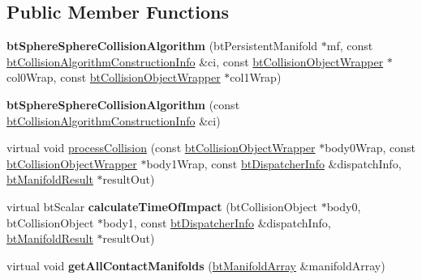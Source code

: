 \subsection*{Public Member Functions}
\begin{DoxyCompactItemize}
\item 
\hypertarget{classbt_sphere_sphere_collision_algorithm_a861896f2389f4b8b4a45fda9dc5f5a88}{{\bfseries bt\+Sphere\+Sphere\+Collision\+Algorithm} (bt\+Persistent\+Manifold $\ast$mf, const \hyperlink{structbt_collision_algorithm_construction_info}{bt\+Collision\+Algorithm\+Construction\+Info} \&ci, const \hyperlink{structbt_collision_object_wrapper}{bt\+Collision\+Object\+Wrapper} $\ast$col0\+Wrap, const \hyperlink{structbt_collision_object_wrapper}{bt\+Collision\+Object\+Wrapper} $\ast$col1\+Wrap)}\label{classbt_sphere_sphere_collision_algorithm_a861896f2389f4b8b4a45fda9dc5f5a88}

\item 
\hypertarget{classbt_sphere_sphere_collision_algorithm_a0e088c92f8e8a1e5a82b118dec7f930c}{{\bfseries bt\+Sphere\+Sphere\+Collision\+Algorithm} (const \hyperlink{structbt_collision_algorithm_construction_info}{bt\+Collision\+Algorithm\+Construction\+Info} \&ci)}\label{classbt_sphere_sphere_collision_algorithm_a0e088c92f8e8a1e5a82b118dec7f930c}

\item 
virtual void \hyperlink{classbt_sphere_sphere_collision_algorithm_a7e5adac437f8c0cdb738360d5946a65d}{process\+Collision} (const \hyperlink{structbt_collision_object_wrapper}{bt\+Collision\+Object\+Wrapper} $\ast$body0\+Wrap, const \hyperlink{structbt_collision_object_wrapper}{bt\+Collision\+Object\+Wrapper} $\ast$body1\+Wrap, const \hyperlink{structbt_dispatcher_info}{bt\+Dispatcher\+Info} \&dispatch\+Info, \hyperlink{classbt_manifold_result}{bt\+Manifold\+Result} $\ast$result\+Out)
\item 
\hypertarget{classbt_sphere_sphere_collision_algorithm_a5866a58caa774b032f8563ab4cdb2747}{virtual bt\+Scalar {\bfseries calculate\+Time\+Of\+Impact} (bt\+Collision\+Object $\ast$body0, bt\+Collision\+Object $\ast$body1, const \hyperlink{structbt_dispatcher_info}{bt\+Dispatcher\+Info} \&dispatch\+Info, \hyperlink{classbt_manifold_result}{bt\+Manifold\+Result} $\ast$result\+Out)}\label{classbt_sphere_sphere_collision_algorithm_a5866a58caa774b032f8563ab4cdb2747}

\item 
\hypertarget{classbt_sphere_sphere_collision_algorithm_a12213d0da7590fd25b9bfb580ab1e70c}{virtual void {\bfseries get\+All\+Contact\+Manifolds} (\hyperlink{classbt_aligned_object_array}{bt\+Manifold\+Array} \&manifold\+Array)}\label{classbt_sphere_sphere_collision_algorithm_a12213d0da7590fd25b9bfb580ab1e70c}

\end{DoxyCompactItemize}
